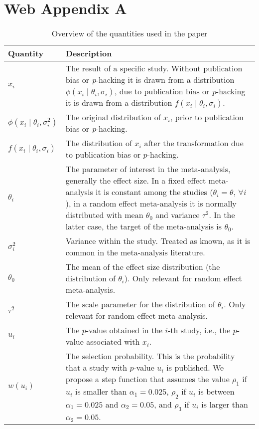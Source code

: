 \section*{Web Appendix A}

\begin{table}[ht]
    \caption{Overview of the quantities used in the paper}
    \label{allQuantities}
    \centering
    \begin{tabular}{l|p{13cm}}
    {\bf Quantity} & {\bf Description} \\
    \hline
    $x_i$ & The result of a specific study. Without publication bias or \textit{p}-hacking it is drawn from a distribution $\phi(x_i \mid \theta_i, \sigma_i)$, due to publication bias or \textit{p}-hacking it is drawn from a distribution $f(x_i \mid \theta_i, \sigma_i)$.\\
    $\phi(x_{i}\mid\theta_{i},\sigma^2_{i})$ & The original distribution of $x_i$, prior to publication bias or \textit{p}-hacking.\\
    $f(x_i \mid \theta_i, \sigma_i)$ & The distribution of $x_i$ after the transformation due to publication bias or $p$-hacking.\\
    $\theta_i$ & The parameter of interest in the meta-analysis, generally the effect size. In a fixed effect meta-analysis it is constant among the studies ($\theta_i = \theta$, $\forall i$), in a random effect meta-analysis it is normally distributed with mean $\theta_0$ and variance $\tau^2$. In the latter case, the target of the meta-analysis is $\theta_0$.\\
    $\sigma^2_i$ & Variance within the study. Treated as known, as it is common in the meta-analysis literature.\\
    $\theta_0$ & The mean of the effect size distribution (the distribution of $\theta_i$). Only relevant for random effect meta-analysis. \\
    $\tau^2$ & The scale parameter for the distribution of $\theta_i$.  Only relevant for random effect meta-analysis. \\
    $u_i$ & The $p$-value obtained in the $i$-th study, i.e., the $p$-value associated with $x_i$.\\
    $w(u_i)$ & The selection probability. This is the probability that a study with $p$-value $u_i$ is published. We propose a step function that assumes the value $\rho_1$ if $u_i$ is smaller than $\alpha_1 = 0.025$, $\rho_2$ if $u_i$ is between $\alpha_1 =0.025$ and $\alpha_2 = 0.05$, and $\rho_3$ if $u_i$ is larger than $\alpha_2 =0.05$.\\

\end{tabular}
\end{table}
